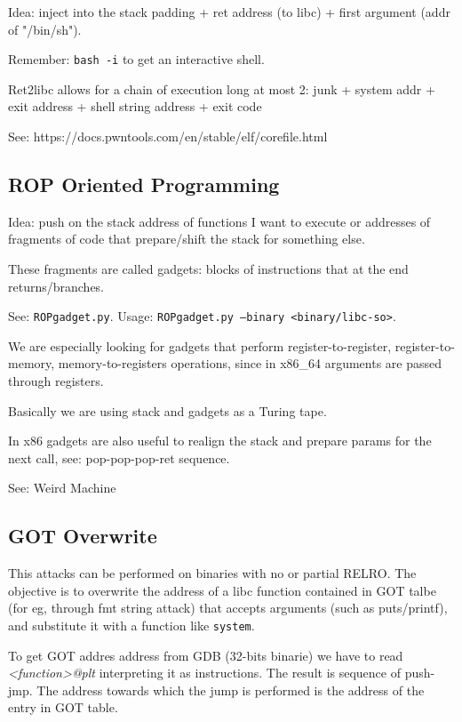 Idea: inject into the stack padding + ret address (to libc) + first argument (addr of "/bin/sh").

Remember: \texttt{bash -i} to get an interactive shell.

Ret2libc allows for a chain of execution long at most 2: junk + system addr + exit address + shell string address + exit code

See: https://docs.pwntools.com/en/stable/elf/corefile.html

\subsection{ROP Oriented Programming}
Idea: push on the stack address of functions I want to execute or addresses of fragments of code that prepare/shift the stack for something else.

These fragments are called gadgets: blocks of instructions that at the end returns/branches.

See: \texttt{ROPgadget.py}. Usage: \texttt{ROPgadget.py --binary <binary/libc-so>}.

We are especially looking for gadgets that perform register-to-register, register-to-memory, memory-to-registers operations, since in x86_64 arguments are passed through registers.

Basically we are using stack and gadgets as a Turing tape.

In x86 gadgets are also useful to realign the stack and prepare params for the next call, see: pop-pop-pop-ret sequence.

See: Weird Machine

\subsection{GOT Overwrite}
This attacks can be performed on binaries with no or partial RELRO.
The objective is to overwrite the address of a libc function contained in GOT talbe (for eg, through fmt string attack) that accepts arguments (such as puts/printf), and substitute it with a function like \texttt{system}.

To get GOT addres address from GDB (32-bits binarie) we have to read \textit{<function>@plt} interpreting it as instructions.
The result is sequence of push-jmp. The address towards which the jump is performed is the address of the entry in GOT table.
